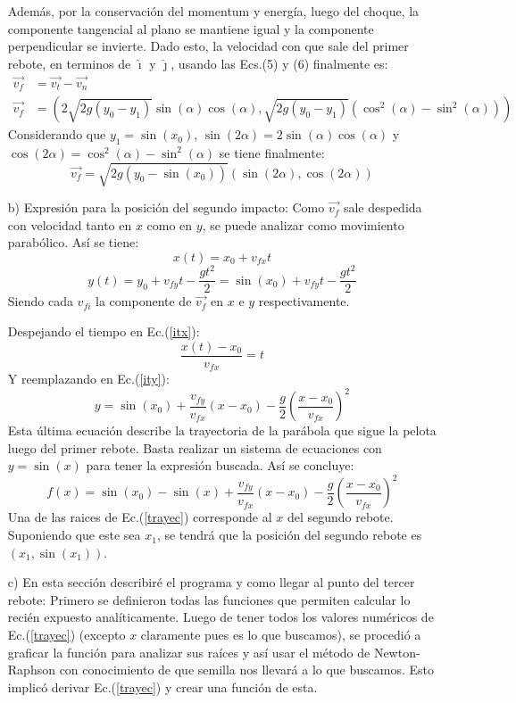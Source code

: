 \documentclass[12pt]{article}
\begin{document}
\begin{itemize}
Además, por la conservación del momentum y energía, luego del choque, la componente tangencial al plano se mantiene igual y la componente perpendicular se invierte. Dado esto, la velocidad con que sale del primer rebote, en terminos de $\hat{\imath}$ y $\hat{\jmath}$, usando las Ecs.(5) y (6) finalmente es:
\begin{align*}
\vec{v_f}&=\vec{v_t}-\vec{v_n} \\
\vec{v_f}&=\left(2\sqrt{2g(y_0-y_1)}\sin(\alpha)\cos(\alpha),\sqrt{2g(y_0-y_1)}(\cos^{2}(\alpha)-\sin^{2}(\alpha))\right)
\end{align*}
Considerando que $y_1=\sin(x_0)$, $\sin(2\alpha)=2\sin(\alpha)\cos(\alpha)$ y $\cos(2\alpha)=\cos^{2}(\alpha)-\sin^{2}(\alpha)$ se tiene finalmente:
\begin{equation*}
\vec{v_f}=\sqrt{2g(y_0-\sin(x_0))}\left(\sin(2\alpha),\cos(2\alpha)\right)
\end{equation*}
\item[b)] Expresión para la posición del segundo impacto:
Como $\vec{v_f}$ sale despedida con velocidad tanto en $x$ como en $y$, se puede analizar como movimiento parabólico. Así se tiene:
\begin{equation}
\label{itx}
x(t)=x_0+v_{fx}t
\end{equation}
\begin{equation}
\label{ity}
y(t)=y_0+v_{fy}t-\frac{gt^2}{2}=\sin(x_0)+v_{fy}t-\frac{gt^2}{2}
\end{equation}
Siendo cada $v_{fi}$ la componente de $\vec{v_f}$ en $x$ e $y$ respectivamente.

Despejando el tiempo en Ec.(\ref{itx}):
\begin{equation*}
\frac{x(t)-x_0}{v_{fx}}=t
\end{equation*}
Y reemplazando en Ec.(\ref{ity}):
\begin{equation*}
y=\sin(x_0)+\frac{v_{fy}}{v_{fx}}(x-x_0)-\frac{g}{2}\left(\frac{x-x_0}{v_{fx}}\right)^2
\end{equation*}
Esta última ecuación describe la trayectoria de la parábola que sigue la pelota luego del primer rebote. Basta realizar un sistema de ecuaciones con $y=\sin(x)$ para tener la expresión buscada. Así se concluye:
\begin{equation}
\label{trayec}
f(x)=\sin(x_0)-\sin(x)+\frac{v_{fy}}{v_{fx}}(x-x_0)-\frac{g}{2}\left(\frac{x-x_0}{v_{fx}}\right)^2
\end{equation}
Una de las raices de Ec.(\ref{trayec}) corresponde al $x$ del segundo rebote. Suponiendo que este sea $x_1$, se tendrá que la posición del segundo rebote es $(x_1,\sin(x_1))$. 
\item[c)]En esta sección describiré el programa y como llegar al punto del tercer rebote:
Primero se definieron todas las funciones que permiten calcular lo recién expuesto analíticamente. Luego de tener todos los valores numéricos de Ec.(\ref{trayec}) (excepto $x$ claramente pues es lo que buscamos), se procedió a graficar la función para analizar sus raíces y así usar el método de Newton-Raphson con conocimiento de que semilla nos llevará a lo que buscamos. Esto implicó derivar Ec.(\ref{trayec}) y crear una función de esta.


\end{itemize}
\end{document}
